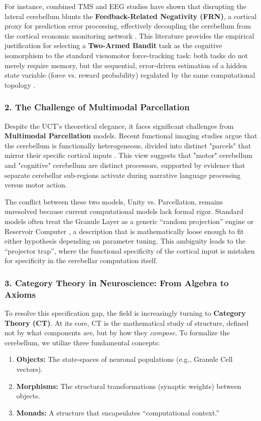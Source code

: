 \documentclass{article}
\begin{document}
	For instance, combined TMS and EEG studies have shown that disrupting the lateral cerebellum blunts the \textbf{Feedback-Related Negativity (FRN)}, a cortical proxy for prediction error processing, effectively decoupling the cerebellum from the cortical economic monitoring network \parencite{huvermannCerebellumContributesPrediction2025}. This literature provides the empirical justification for selecting a \textbf{Two-Armed Bandit} task as the cognitive isomorphism to the standard visuomotor force-tracking task: both tasks do not merely require memory, but the sequential, error-driven estimation of a hidden state variable (force vs. reward probability) regulated by the same computational topology \parencite{schultzNeuronalRewardDecision2015}.
	
	\subsubsection*{2. The Challenge of Multimodal Parcellation}
	Despite the UCT's theoretical elegance, it faces significant challenges from \textbf{Multimodal Parcellation} models. Recent functional imaging studies argue that the cerebellum is functionally heterogeneous, divided into distinct "parcels" that mirror their specific cortical inputs \parencite{diedrichsenUniversalTransformMultiple2019}. This view suggests that "motor" cerebellum and "cognitive" cerebellum are distinct processors, supported by evidence that separate cerebellar sub-regions activate during narrative language processing versus motor action.
	
	The conflict between these two models, Unity vs. Parcellation, remains unresolved because current computational models lack formal rigor. Standard models often treat the Granule Layer as a generic ``random projection'' engine or Reservoir Computer \parencite{souresSpikingReservoirNetworks2019}, a description that is mathematically loose enough to fit either hypothesis depending on parameter tuning. This ambiguity leads to the ``projector trap'', where the functional specificity of the cortical input is mistaken for specificity in the cerebellar computation itself.
	
	\subsubsection*{3. Category Theory in Neuroscience: From Algebra to Axioms}
	To resolve this specification gap, the field is increasingly turning to \textbf{Category Theory (CT)}. At its core, CT is the mathematical study of structure, defined not by what components \textit{are}, but by how they \textit{compose}. To formalize the cerebellum, we utilize three fundamental concepts:
	\begin{enumerate}
		\item \textbf{Objects:} The state-spaces of neuronal populations (e.g., Granule Cell vectors).
		\item \textbf{Morphisms:} The structural transformations (synaptic weights) between objects.
		\item \textbf{Monads:} A structure that encapsulates ``computational context.''
	\end{enumerate}
	
\end{document}
